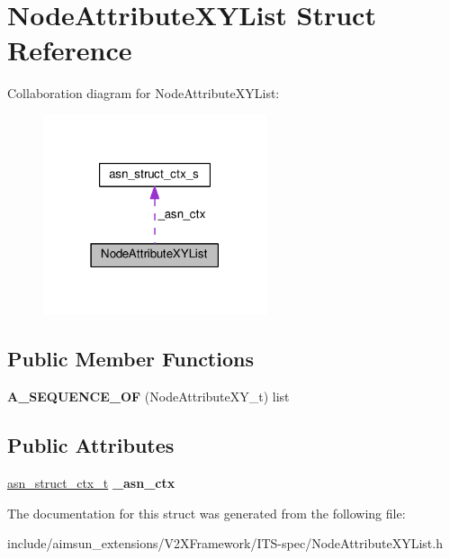 \hypertarget{structNodeAttributeXYList}{}\section{Node\+Attribute\+X\+Y\+List Struct Reference}
\label{structNodeAttributeXYList}


Collaboration diagram for Node\+Attribute\+X\+Y\+List\+:\nopagebreak
\begin{figure}[H]
\begin{center}
\leavevmode
\includegraphics[width=186pt]{structNodeAttributeXYList__coll__graph}
\end{center}
\end{figure}
\subsection*{Public Member Functions}
\begin{DoxyCompactItemize}
\item 
{\bfseries A\+\_\+\+S\+E\+Q\+U\+E\+N\+C\+E\+\_\+\+OF} (Node\+Attribute\+X\+Y\+\_\+t) list\hypertarget{structNodeAttributeXYList_ab75aa1939e04838f57cda8af8827e722}{}\label{structNodeAttributeXYList_ab75aa1939e04838f57cda8af8827e722}

\end{DoxyCompactItemize}
\subsection*{Public Attributes}
\begin{DoxyCompactItemize}
\item 
\hyperlink{structasn__struct__ctx__s}{asn\+\_\+struct\+\_\+ctx\+\_\+t} {\bfseries \+\_\+asn\+\_\+ctx}\hypertarget{structNodeAttributeXYList_a903a9086af7ca66611a6ec64648d3c09}{}\label{structNodeAttributeXYList_a903a9086af7ca66611a6ec64648d3c09}

\end{DoxyCompactItemize}


The documentation for this struct was generated from the following file\+:\begin{DoxyCompactItemize}
\item 
include/aimsun\+\_\+extensions/\+V2\+X\+Framework/\+I\+T\+S-\/spec/Node\+Attribute\+X\+Y\+List.\+h\end{DoxyCompactItemize}

